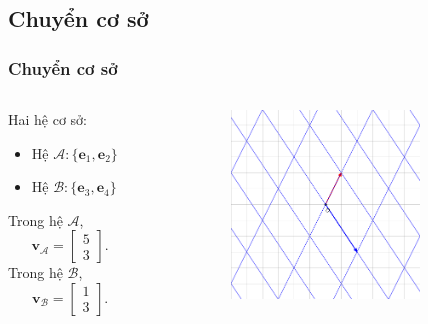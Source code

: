 \subsection{Chuyển cơ sở}
\begin{frame}
    \frametitle{Chuyển cơ sở}
    \begin{columns}
        \begin{column}{0.5\textwidth}
            Hai hệ cơ sở:
               \begin{itemize}
                  \item Hệ \(\mathcal{A}:\{\mathbf{e}_1 ,\mathbf{e}_2\}\) 
                \item Hệ \(\mathcal{B}:\{\mathbf{e}_3 ,\mathbf{e}_4\}\) 
                \end{itemize}
    Trong hệ \(\mathcal{A}\), \[\mathbf{v}_{\mathcal{A}}=\begin{bmatrix}
    5\\3
\end{bmatrix}.\] Trong hệ \(\mathcal{B}\), \[\mathbf{v}_{\mathcal{B}}=\begin{bmatrix}
    1\\3
\end{bmatrix}.\]
        \end{column}
        \begin{column}{0.5\textwidth}
            \begin{figure}
                \centering
                \includegraphics[width=7cm, height=5cm]{Slides/Figure/LT10.png}
            \end{figure}
        \end{column}
    \end{columns}
\end{frame}
